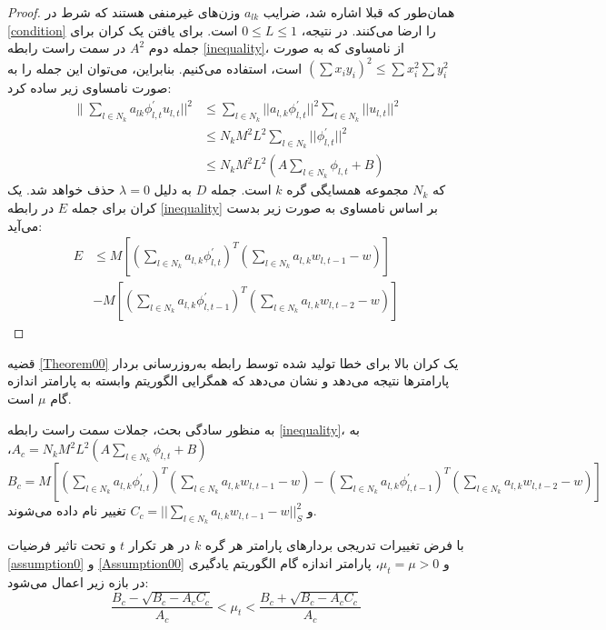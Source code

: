 \begin{proof}
	همان‌طور که قبلا اشاره شد، ضرایب $a_{lk}$ وزن‌های غیرمنفی هستند که شرط در \ref{condition} را ارضا می‌کنند. در نتیجه، $0\leq L\leq 1$ است. برای یافتن یک کران برای جمله دوم $A^2$ در سمت راست رابطه \ref{inequality}، از نامساوی  که به صورت $(\sum x_i y_i)^2\leq \sum x_i^2 \sum y_i^2$ است، استفاده می‌کنیم. بنابراین، می‌توان این جمله را به صورت نامساوی زیر ساده کرد: 
	\begin{equation*}
		\begin{split}
			\lVert\sum_{l\in N_k} a_{lk}\phi^{'}_{l,t}u_{l,t}\rvert\rvert^2&\leq \sum_{l\in N_k}\lvert\lvert a_{l,k}\phi^{'}_{l,t}\rvert\rvert^2 \sum_{l\in N_k}\lvert\lvert u_{l,t}\rvert\rvert^2\\
			&\leq N_k M^2 L^2\sum_{l\in N_k}\lvert\lvert \phi^{'}_{l,t}\rvert\rvert^2\\
			&\leq N_k M^2 L^2(A\sum_{l\in N_k}\phi_{l,t}+B)
		\end{split}
	\end{equation*}
	که $N_k$ مجموعه همسایگی گره $k$ است. جمله $D$ به دلیل $\lambda=0$ حذف خواهد شد. یک کران برای جمله $E$ در رابطه \ref{inequality} بر اساس نامساوی  به صورت زیر بدست می‌آید:
	\begin{equation*}
		\begin{split}
			E&\leq M\left[(\sum_{l\in N_k}a_{l,k}\phi^{'}_{l,t})^T(\sum_{l\in N_k}a_{l,k}w_{l,t-1}-w)\right]\\
			&-M\left[(\sum_{l\in N_k}a_{l,k}\phi^{'}_{l,t-1})^T(\sum_{l\in N_k}a_{l,k}w_{l,t-2}-w)\right]
		\end{split}
	\end{equation*}
\end{proof}

قضیه \ref{Theorem00} یک کران بالا برای خطا تولید شده توسط رابطه به‌روزرسانی بردار پارامترها نتیجه می‌دهد و نشان می‌دهد که همگرایی الگوریتم  وابسته به پارامتر اندازه گام $\mu$ است. 

به منظور سادگی بحث، جملات سمت راست رابطه \ref{inequality}، به $A_c=N_kM^2L^2(A\sum_{l\in N_k}\phi_{l,t} +B)$،   $B_c=M[(\sum_{l\in N_k}a_{l,k}\phi^{'}_{l,t})^T(\sum_{l\in N_k}a_{l,k}w_{l,t-1}-w)-(\sum_{l\in N_k}a_{l,k}\phi^{'}_{l,t-1})^T(\sum_{l\in N_k}a_{l,k}w_{l,t-2}-w)]$ و $C_c=\lvert\lvert \sum_{l\in N_k}{a_{l,k}w_{l,t-1}-w} \rvert\rvert^2_S$ تغییر نام داده می‌شوند. 

\begin{theorem}
	با فرض تغییرات تدریجی بردارهای پارامتر هر گره $k$ در هر تکرار $t$ و تحت تاثیر فرضیات \ref{assumption0} و \ref{Assumption00} و $\mu_t=\mu>0$، پارامتر اندازه گام الگوریتم یادگیری  در بازه زیر اعمال می‌شود: 
	\begin{equation}\label{cond_eta}
		\frac{B_c-\sqrt{B_c-A_cC_c}}{A_c}<\mu_t<\frac{B_c+\sqrt{B_c-A_cC_c}}{A_c}
	\end{equation}
\end{theorem}

